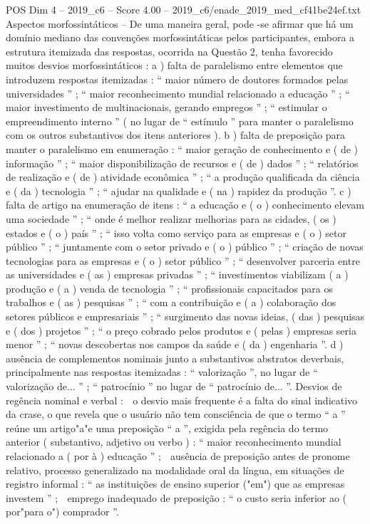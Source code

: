 \begin{textsample}{POS Dim 4 – 2019\_c6 – Score 4.00 – 2019\_c6/enade\_2019\_med\_cf41be24ef.txt}
Aspectos morfossintáticos – De uma maneira geral, pode -se afirmar que há um domínio mediano das convenções morfossintáticas pelos participantes, embora a estrutura itemizada das respostas, ocorrida na Questão 2, tenha favorecido muitos desvios morfossintáticos : a ) falta de paralelismo entre elementos que introduzem respostas itemizadas : “ maior número de doutores formados pelas universidades ” ; “ maior reconhecimento mundial relacionado a educação ” ; “ maior investimento de multinacionais, gerando empregos ” ; “ estimular o empreendimento interno ” ( no lugar de “ estímulo ” para manter o paralelismo com os outros substantivos dos itens anteriores ). b ) falta de preposição para manter o paralelismo em enumeração : “ maior geração de conhecimento e ( de ) informação ” ; “ maior disponibilização de recursos e ( de ) dados ” ; “ relatórios de realização e ( de ) atividade econômica ” ; “ a produção qualificada da ciência e ( da ) tecnologia ” ; “ ajudar na qualidade e ( na ) rapidez da produção ”. c ) falta de artigo na enumeração de itens : “ a educação e ( o ) conhecimento elevam uma sociedade ” ; “ onde é melhor realizar melhorias para as cidades, ( os ) estados e ( o ) país ” ; “ isso volta como serviço para as empresas e ( o ) setor público ” ; “ juntamente com o setor privado e ( o ) público ” ; “ criação de novas tecnologias para as empresas e ( o ) setor público ” ; “ desenvolver parceria entre as universidades e ( as ) empresas privadas ” ; “ investimentos viabilizam ( a ) produção e ( a ) venda de tecnologia ” ; “ profissionais capacitados para os trabalhos e ( as ) pesquisas ” ; “ com a contribuição e ( a ) colaboração dos setores públicos e empresariais ” ; “ surgimento das novas ideias, ( das ) pesquisas e ( dos ) projetos ” ; “ o preço cobrado pelos produtos e ( pelas ) empresas seria menor ” ; “ novas descobertas nos campos da saúde e ( da ) engenharia ”. d ) ausência de complementos nominais junto a substantivos abstratos deverbais, principalmente nas respostas itemizadas : “ valorização ”, no lugar de “ valorização de... ” ; “ patrocínio ” no lugar de “ patrocínio de... ”.
Desvios de regência nominal e verbal :  o desvio mais frequente é a falta do sinal indicativo da crase, o que revela que o usuário não tem consciência de que o termo “ a ” reúne um artigo"a"e uma preposição “ a ”, exigida pela regência do termo anterior ( substantivo, adjetivo ou verbo ) : “ maior reconhecimento mundial relacionado a ( por à ) educação ” ;  ausência de preposição antes de pronome relativo, processo generalizado na modalidade oral da língua, em situações de registro informal : “ as instituições de ensino superior ("em") que as empresas investem ” ;  emprego inadequado de preposição : “ o custo seria inferior ao ( por"para o") comprador ”.

\end{textsample}
